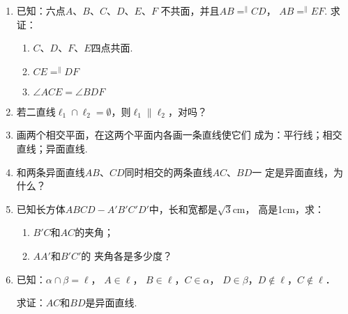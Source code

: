 \begin{enumerate}
\item 已知：六点$A$、$B$、$C$、$D$、$E$、$F$
不共面，并且$AB\displaystyle\mathop{=}^{\parallel} CD$，
$AB\displaystyle\mathop{=}^{\parallel}EF$.
求证：
\begin{enumerate}
  \item $C$、$D$、$F$、$E$四点共面.
  \item $CE\displaystyle\mathop{=}^{\parallel} DF$
  \item $\angle ACE=\angle BDF$
\end{enumerate}

\item 若二直线$\ell_1\cap\ell_2=\emptyset$，则$\ell_1\parallel \ell_2$，对吗？
\item 画两个相交平面，在这两个平面内各画一条直线使它们
成为：平行线；相交直线；异面直线.
\item 和两条异面直线$AB$、$CD$同时相交的两条直线$AC$、$BD$一
定是异面直线，为什么？
\item 已知长方体$ABCD-A'B'C'D'$中，长和宽都是$\sqrt{3}$cm，
高是1cm，求：
\begin{enumerate}
  \item $B'C$和$AC$的夹角；
  \item $AA'$和$B'C'$的
夹角各是多少度？
\end{enumerate}

\item 已知：$\alpha\cap\beta=\ell$， $A\in\ell$， $B\in\ell$，$C\in\alpha$， $D\in\beta$，$D\notin \ell$，$C\notin\ell$．

求证：$AC$和$BD$是异面直线.


\end{enumerate}
